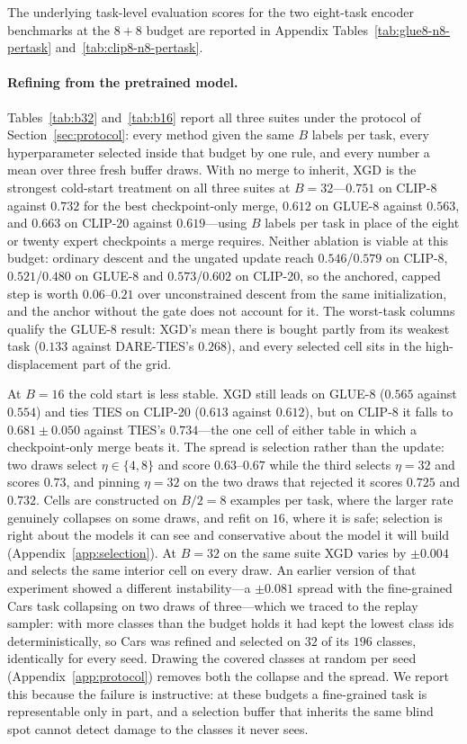 \documentclass{article} %
\begin{document}
The underlying task-level evaluation scores for the two eight-task encoder benchmarks at the
$8{+}8$ budget are reported in Appendix
Tables~\ref{tab:glue8-n8-pertask} and~\ref{tab:clip8-n8-pertask}.

\paragraph{Refining from the pretrained model.}
Tables~\ref{tab:b32} and~\ref{tab:b16} report all three suites under the protocol of Section~\ref{sec:protocol}: every method given the same $B$ labels per task, every hyperparameter selected inside that budget by one rule, and every number a mean over three fresh buffer draws. With no merge to inherit, XGD is the strongest cold-start treatment on all three suites at $B=32$---$0.751$ on CLIP-8 against $0.732$ for the best checkpoint-only merge, $0.612$ on GLUE-8 against $0.563$, and $0.663$ on CLIP-20 against $0.619$---using $B$ labels per task in place of the eight or twenty expert checkpoints a merge requires. Neither ablation is viable at this budget: ordinary descent and the ungated update reach $0.546$/$0.579$ on CLIP-8, $0.521$/$0.480$ on GLUE-8 and $0.573$/$0.602$ on CLIP-20, so the anchored, capped step is worth $0.06$--$0.21$ over unconstrained descent from the same initialization, and the anchor without the gate does not account for it. The worst-task columns qualify the GLUE-8 result: XGD's mean there is bought partly from its weakest task ($0.133$ against DARE-TIES's $0.268$), and every selected cell sits in the high-displacement part of the grid.

At $B=16$ the cold start is less stable. XGD still leads on GLUE-8 ($0.565$ against $0.554$) and ties TIES on CLIP-20 ($0.613$ against $0.612$), but on CLIP-8 it falls to $0.681\pm0.050$ against TIES's $0.734$---the one cell of either table in which a checkpoint-only merge beats it. The spread is selection rather than the update: two draws select $\eta\in\{4,8\}$ and score $0.63$--$0.67$ while the third selects $\eta=32$ and scores $0.73$, and pinning $\eta=32$ on the two draws that rejected it scores $0.725$ and $0.732$. Cells are constructed on $B/2=8$ examples per task, where the larger rate genuinely collapses on some draws, and refit on $16$, where it is safe; selection is right about the models it can see and conservative about the model it will build (Appendix~\ref{app:selection}). At $B=32$ on the same suite XGD varies by $\pm0.004$ and selects the same interior cell on every draw. An earlier version of that experiment showed a different instability---a $\pm0.081$ spread with the fine-grained Cars task collapsing on two draws of three---which we traced to the replay sampler: with more classes than the budget holds it had kept the lowest class ids deterministically, so Cars was refined and selected on $32$ of its $196$ classes, identically for every seed. Drawing the covered classes at random per seed (Appendix~\ref{app:protocol}) removes both the collapse and the spread. We report this because the failure is instructive: at these budgets a fine-grained task is representable only in part, and a selection buffer that inherits the same blind spot cannot detect damage to the classes it never sees.
\end{document}
